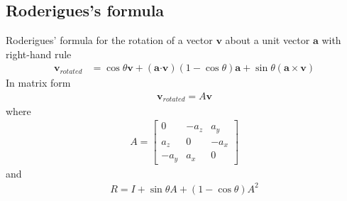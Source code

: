 \documentclass[10pt,letterpaper,notitlepage]{article}
\numberwithin{equation}{section}
\newcommand{\dotp}{\boldsymbol{\cdot}}
\newcommand{\beqn}{\begin{equation}\begin{aligned}}
\newcommand{\eeqn}{\end{aligned}\end{equation}}
\begin{document}
\newpage
\begin{appendices}
\section{Roderigues's formula} \label{appendix:Roderigues_formula}
Roderigues' formula for the rotation of a vector $\mathbf{v}$ about a unit vector $\mathbf{a}$ with right-hand rule
\begin{equation}
\newcommand{\vvec}{\mathbf{v}}
\newcommand{\avec}{\mathbf{a}}
\begin{aligned}
\vvec_{rotated} &= \cos \theta \vvec + (\avec \dotp \vvec)(1-\cos \theta) \avec + \sin \theta (\avec \times \vvec)
\end{aligned}
\end{equation}
In matrix form
\beqn 
\mathbf{v}_{rotated} = A \mathbf{v}
\eeqn 
where
\beqn 
A = 
\begin{bmatrix}
0 & -a_z & a_y \\
a_z & 0 & -a_x \\
-a_y & a_x & 0
\end{bmatrix}
\eeqn 
and
\beqn 
R = I + \sin\theta A + (1-\cos\theta) A^2
\eeqn

\end{appendices}
\end{document}
